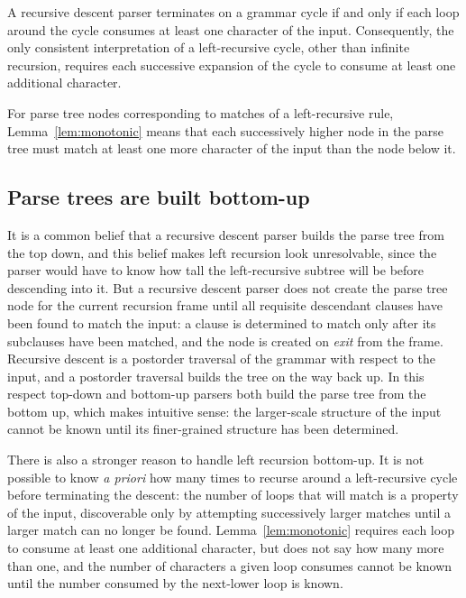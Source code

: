 \documentclass[manuscript]{acmart}
\begin{document}
\begin{lemma}
\label{lem:monotonic}
A recursive descent parser terminates on a grammar cycle if and only if each loop around the cycle consumes at least one character of the input. Consequently, the only consistent interpretation of a left-recursive cycle, other than infinite recursion, requires each successive expansion of the cycle to consume at least one additional character.
\end{lemma}

For parse tree nodes corresponding to matches of a left-recursive rule, Lemma~\ref{lem:monotonic} means that each successively higher node in the parse tree must match at least one more character of the input than the node below it.

\subsection{Parse trees are built bottom-up}
\label{sec:postorder}

It is a common belief that a recursive descent parser builds the parse tree from the top down, and this belief makes left recursion look unresolvable, since the parser would have to know how tall the left-recursive subtree will be before descending into it. But a recursive descent parser does not create the parse tree node for the current recursion frame until all requisite descendant clauses have been found to match the input: a clause is determined to match only after its subclauses have been matched, and the node is created on \emph{exit} from the frame. Recursive descent is a postorder traversal of the grammar with respect to the input, and a postorder traversal builds the tree on the way back up. In this respect top-down and bottom-up parsers both build the parse tree from the bottom up, which makes intuitive sense: the larger-scale structure of the input cannot be known until its finer-grained structure has been determined.

There is also a stronger reason to handle left recursion bottom-up. It is not possible to know \emph{a priori} how many times to recurse around a left-recursive cycle before terminating the descent: the number of loops that will match is a property of the input, discoverable only by attempting successively larger matches until a larger match can no longer be found. Lemma~\ref{lem:monotonic} requires each loop to consume at least one additional character, but does not say how many more than one, and the number of characters a given loop consumes cannot be known until the number consumed by the next-lower loop is known.
\end{document}
